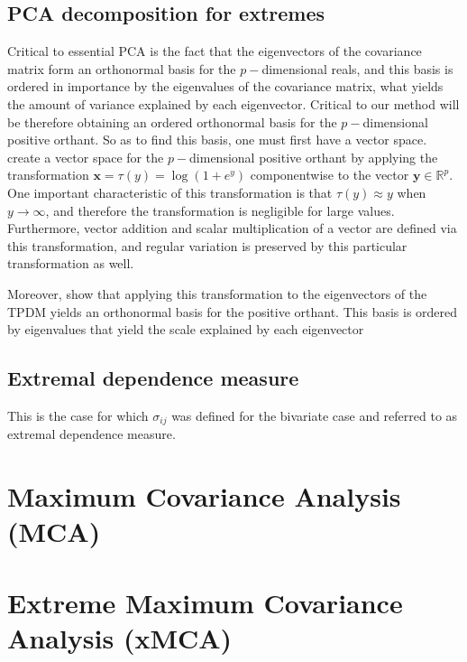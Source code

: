 \documentclass[11pt, oneside]{book}
\theoremstyle{plain}
\theoremstyle{remark}
\begin{document}
\subsection{PCA decomposition for extremes}
Critical to essential PCA is the fact that the eigenvectors of the covariance
matrix form an orthonormal basis for the $p-$dimensional reals, and this basis
is ordered in importance by the eigenvalues of the covariance matrix, what
yields the amount of variance explained by each eigenvector. Critical to our
method will be therefore obtaining an ordered orthonormal basis for the
$p-$dimensional positive orthant. So as to find this basis, one must first have
a vector space. \cite{cooley-thibaud} create a vector space for the
$p-$dimensional positive orthant by applying the transformation $\mathbf{x} =
\tau(y) = \log(1+e^y)$ componentwise to the vector $\mathbf{y}\in\mathbb{R}^p$.
One important characteristic of this transformation is that
$\tau(y)\approx y$ when $y\to\infty$, and therefore the transformation is
negligible for large values. Furthermore, vector addition and scalar
multiplication of a vector are defined via this transformation, and regular
variation is preserved by this particular transformation as well. 

Moreover, \cite{cooley-thibaud} show that applying this transformation to the
eigenvectors of the TPDM yields an orthonormal basis for the positive orthant.
This basis is ordered by eigenvalues that yield the scale explained by each
eigenvector 


















\subsection{Extremal dependence measure}
This is the case for which $\sigma_{ij}$ was defined for the bivariate case and
referred to as extremal dependence measure.


\section{Maximum Covariance Analysis (MCA)}

\section{Extreme Maximum Covariance Analysis (xMCA)}
\end{document}
